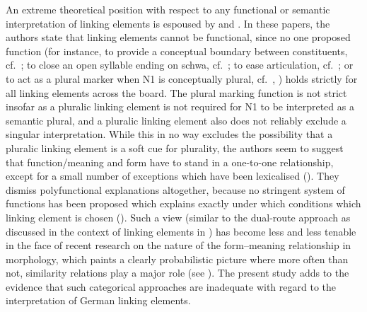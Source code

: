 An extreme theoretical position with respect to any functional or semantic interpretation of linking elements is espoused by \citet{NeefBorgwaldt2012} and \citet{Neef2015}.
In these papers, the authors state that linking elements cannot be functional, since no one proposed function (for instance, to provide a conceptual boundary between constituents, cf.\ \citealt[530]{Fuhrhop1996}; to close an open syllable ending on schwa, cf.\ \citealt[446]{Wegener2003}; to ease articulation, cf.\ \citealt[177]{Wegener2005}; or to act as a plural marker when N1 is conceptually plural, cf.\ \citealt[534]{Fuhrhop1996}, \citealt[427]{Wegener2003}) holds strictly for all linking elements across the board.
The plural marking function is not strict insofar as a pluralic linking element is not required for N1 to be interpreted as a semantic plural, and a pluralic linking element also does not reliably exclude a singular interpretation.
While this in no way excludes the possibility that a pluralic linking element is a soft cue for plurality, the authors seem to suggest that function\slash meaning and form have to stand in a one-to-one relationship, except for a small number of exceptions which have been lexicalised (\eg \citealt[42]{NeefBorgwaldt2012}).
They dismiss polyfunctional explanations altogether, because no stringent system of functions has been proposed which explains exactly under which conditions which linking element is chosen (\eg \citealt[27--29]{NeefBorgwaldt2012}).
Such a view (similar to the dual-route approach as discussed in the context of linking elements in \citealt{KrottEa2007}) has become less and less tenable in the face of recent research on the nature of the form--meaning relationship in morphology, which paints a clearly probabilistic picture where more often than not, similarity relations play a major role (see \citealt[107]{ArndtlappeEa2016}).
The present study adds to the evidence that such categorical approaches are inadequate with regard to the interpretation of German linking elements.

